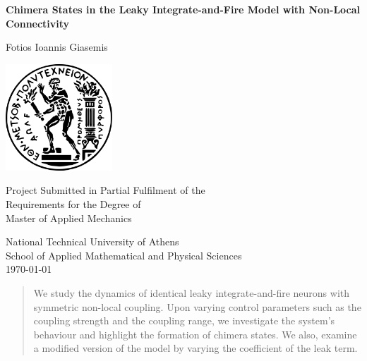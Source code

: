 \documentclass[a4paper,12pt]{article}
\begin{document}
\begin{titlepage}
\begin{center}
\vspace*{1cm}
 
\Huge
\textbf{Chimera States in the Leaky Integrate-and-Fire Model with Non-Local Connectivity}
 
\vspace{0.5cm}
\LARGE
 
\vspace{1.5cm}

Fotios Ioannis Giasemis
 
\vfill

\includegraphics[width=0.3\textwidth]{mets.png}

\vfill
 
Project Submitted in Partial Fulfilment of the\\ Requirements for the Degree of\\ Master of Applied Mechanics
 
\vspace{.8cm}
 

 

National Technical University of Athens\\ 
School of Applied Mathematical and Physical Sciences\\
\today
 
\end{center}
\end{titlepage}

\tableofcontents
\pagebreak

\hline
\begin{abstract}
We study the dynamics of identical leaky integrate-and-fire neurons with symmetric non-local coupling. Upon varying control parameters such as the coupling strength and the coupling range, we investigate the system's behaviour and highlight the formation of chimera states. We also, examine a modified version of the model by varying the coefficient of the leak term.
\end{abstract}
\hline
\end{document}
